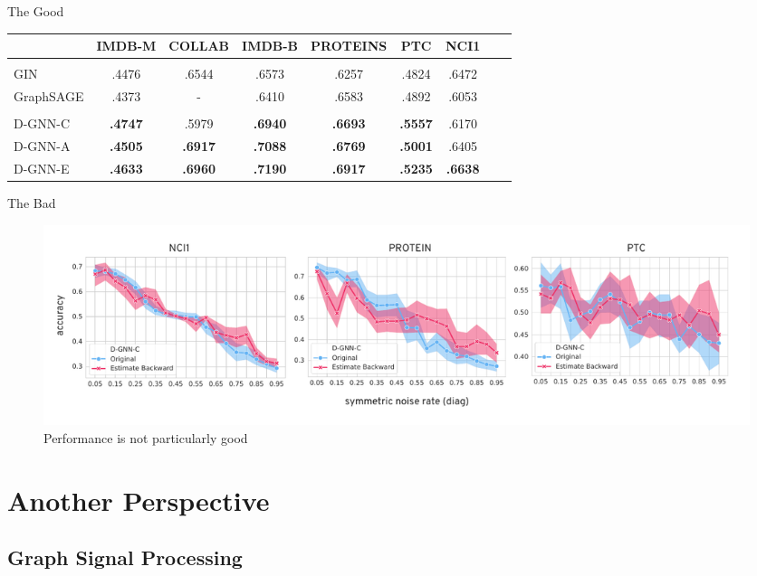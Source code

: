 \documentclass{beamer}
\begin{document}
    \begin{frame}{The Good}
        \footnotesize
        \begin{tabular}{lcccccccc}
                                   & IMDB-M   & COLLAB    & IMDB-B   & PROTEINS    & PTC         & NCI1 \\
    \hline \\
    GIN                          & .4476    & .6544     & .6573    & .6257       & .4824       & .6472 \\
    GraphSAGE                   & .4373        & -         & .6410    & .6583       & .4892       & .6053 
    \vspace{0.5em}\\
    \hline \vspace{-0.5em} \\
    D-GNN-C                     &  \bf.4747   &  .5979    & \bf.6940 & \bf.6693    & \bf.5557       &  .6170 \\
    D-GNN-A                    &  \bf.4505   &  \bf.6917 & \bf.7088 & \bf.6769    & \bf.5001       & .6405  \\
    D-GNN-E                    &  \bf.4633   &  \bf.6960 & \bf.7190 & \bf.6917    & \bf.5235       & \bf.6638 \\
  \end{tabular}
    \end{frame}


    \begin{frame}{The Bad}
        \begin{figure}
            \centering
            \includegraphics[width=\textwidth]{imgs/notgood}
            \caption{Performance is not particularly good}
            \label{fig:d}
        \end{figure}
    \end{frame}


    \section{Another Perspective}

    \subsection{Graph Signal Processing}
\end{document}
